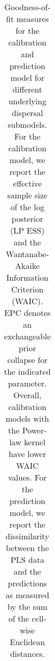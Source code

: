 \begin{table}
\begin{center}
\begin{tabular}{ccccc}
\bottomrule
\end{tabular}
\caption{Goodness-of-fit measures for the calibration and prediction
  model for different underlying dispersal submodels. For the
  calibration model, we report the effective sample size of the log
  posterior (LP ESS) and the Wantanabe-Akaike Information Criterion
  (WAIC). EPC denotes an exchangeable prior collapse for the indicated
  parameter. Overall, calibration models with the Power-law kernel
  have lower WAIC values. For the prediction model, we report the
  dissimilarity between the PLS data and the predictions as measured
  by the sum of the cell-wise Euclidean distances.}
\label{table:GOF}
\end{center}
\vspace{2cm}
\end{table}

